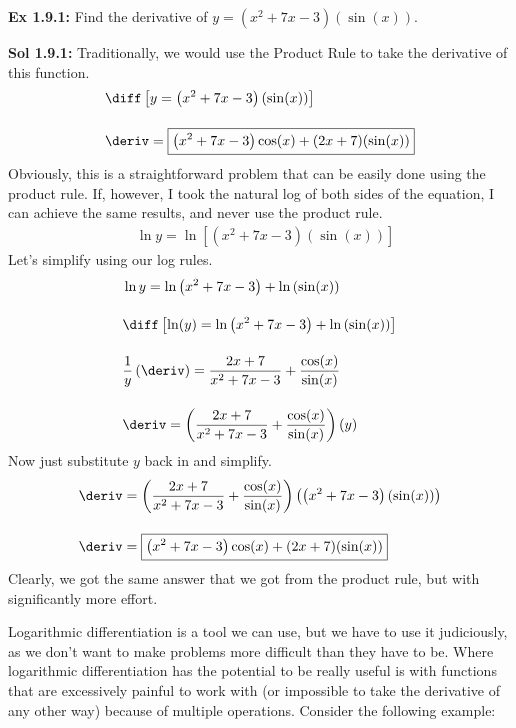 \begin{tcolorbox}[example]
    \textbf{Ex 1.9.1: } Find the derivative of $y = \left(x^2 + 7x - 3\right)(\sin (x))$.
\end{tcolorbox}
\begin{tcolorbox}[solution]
    \textbf{Sol 1.9.1: } Traditionally, we would use the Product Rule to take the derivative of this function. \begin{align*}
        & \diff \left[y = \left(x^2 + 7x - 3\right)(\sin (x))\right] \\[11pt]
        & \deriv = \boxed{\left(x^2 + 7x - 3\right)\cos (x) + (2x + 7)(\sin (x))}
    \end{align*} 
    Obviously, this is a straightforward problem that can be easily done using the product rule. If, however, I took the natural log of both sides of the equation, I can achieve the same results, and never use the product rule. \begin{align*}
        & \ln y = \ln \left[\left(x^2 + 7x - 3\right)(\sin (x))\right] 
    \end{align*}
    Let's simplify using our log rules. \begin{align*}
        & \ln y = \ln \left(x^2 + 7x - 3\right) + \ln \left(\sin (x)\right) \\[11pt]
        & \diff \left[\ln (y) = \ln \left(x^2 + 7x - 3\right) + \ln \left(\sin (x)\right) \right] \\[11pt]
        & \dfrac{1}{y}\left(\deriv\right) = \dfrac{2x + 7}{x^2 + 7x - 3} + \dfrac{\cos (x)}{\sin (x)} \\[11pt]
        & \deriv = \left(\dfrac{2x + 7}{x^2 + 7x - 3} + \dfrac{\cos (x)}{\sin (x)} \right)(y) 
    \end{align*}
    Now just substitute $y$ back in and simplify. \begin{align*}
        & \deriv = \left(\dfrac{2x + 7}{x^2 + 7x - 3} + \dfrac{\cos (x)}{\sin (x)} \right)\left( \left(x^2 + 7x - 3\right)(\sin (x))\right) \\[11pt]
        & \deriv = \boxed{ \left(x^2 + 7x - 3\right)\cos (x) + (2x + 7)(\sin (x))}
    \end{align*}
    Clearly, we got the same answer that we got from the product rule, but with significantly more effort.
\end{tcolorbox}

Logarithmic differentiation is a tool we can use, but we have to use it judiciously, as we don't want to make problems more difficult than they have to be. Where logarithmic differentiation has the potential to be really useful is with functions that are excessively painful to work with (or impossible to take the derivative of any other way) because of multiple operations. Consider the following example: \par

